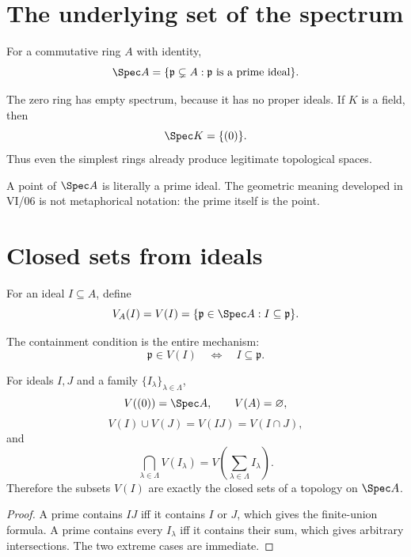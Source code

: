 \section{The underlying set of the spectrum}

\begin{definition}
For a commutative ring $A$ with identity,
\[
\Spec A=\{\mathfrak p\subsetneq A:\mathfrak p\text{ is a prime ideal}\}.
\]
\end{definition}

The zero ring has empty spectrum, because it has no proper ideals.  If $K$ is a field, then
\[
\Spec K=\{(0)\}.
\]
Thus even the simplest rings already produce legitimate topological spaces.

\begin{remark}
A point of $\Spec A$ is literally a prime ideal.  The geometric meaning developed in VI/06
is not metaphorical notation: the prime itself is the point.
\end{remark}

\section{Closed sets from ideals}

\begin{definition}
For an ideal $I\subseteq A$, define
\[
V_A(I)=V(I)=\{\mathfrak p\in\Spec A:I\subseteq\mathfrak p\}.
\]
\end{definition}

The containment condition is the entire mechanism:
\[
\mathfrak p\in V(I)\quad\Longleftrightarrow\quad I\subseteq\mathfrak p.
\]



\begin{theorem}
For ideals $I,J$ and a family $\{I_\lambda\}_{\lambda\in\Lambda}$,
\[
V((0))=\Spec A,\qquad V(A)=\varnothing,
\]
\[
V(I)\cup V(J)=V(IJ)=V(I\cap J),
\]
and
\[
\bigcap_{\lambda\in\Lambda}V(I_\lambda)
=
V\!\left(\sum_{\lambda\in\Lambda}I_\lambda\right).
\]
Therefore the subsets $V(I)$ are exactly the closed sets of a topology on $\Spec A$.
\end{theorem}

\begin{proof}
A prime contains $IJ$ iff it contains $I$ or $J$, which gives the finite-union formula.
A prime contains every $I_\lambda$ iff it contains their sum, which gives arbitrary
intersections.  The two extreme cases are immediate.
\end{proof}

